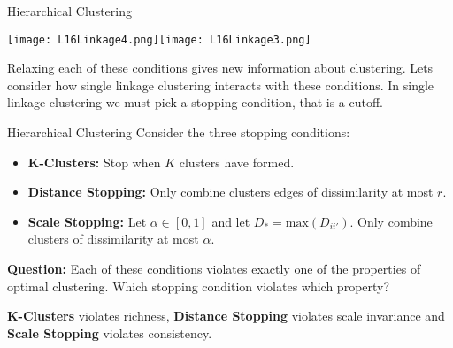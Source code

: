 \documentclass[10pt, table, dvipsnames,xcdraw,handout]{beamer}
\begin{document}
\begin{frame}[fragile]{Hierarchical Clustering}
  \begin{minipage}[t][0.5\textheight][t]{\textwidth}
	\centering \texttt{[image: L16Linkage4.png]}\texttt{[image: L16Linkage3.png]}
  \end{minipage}
  \vfill
\begin{minipage}[t][0.5\textheight][t]{\textwidth}
Relaxing each of these conditions gives new information about clustering. Lets consider how single linkage clustering interacts with these conditions. In single linkage clustering we must pick a stopping condition, that is a cutoff. 
\end{minipage}
\end{frame}


\begin{frame}[fragile]{Hierarchical Clustering}
Consider the three stopping conditions:
\begin{itemize}
\item\textbf{K-Clusters:} Stop when $K$ clusters have formed.\pause

\item\textbf{Distance Stopping:} Only combine clusters edges of dissimilarity at most $r$. \pause

\item\textbf{Scale Stopping:} Let $\alpha\in [0,1]$ and let $D_* = \text{max}(D_{ii'})$. Only combine clusters of dissimilarity at most $\alpha$. 

\end{itemize}
\textbf{Question:} Each of these conditions violates exactly one of the properties of optimal clustering. Which stopping condition violates which property?\pause

\textbf{K-Clusters} violates richness,  \textbf{Distance Stopping} violates scale invariance and \textbf{Scale Stopping} violates consistency.
\end{frame}
\end{document}
